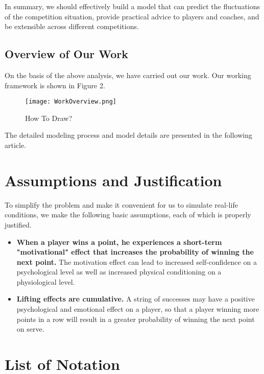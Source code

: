 \documentclass{mcmthesis}
\begin{document}
In summary, we should effectively build a model that can predict the fluctuations of the
competition situation, provide practical advice to players and coaches, and be extensible across
different competitions.
\subsection{Overview of Our Work}

On the basis of the above analysis, we have carried out our work. Our working framework
is shown in Figure 2.

\begin{figure}[h] 
  \centering
  \texttt{[image: WorkOverview.png]}
  \caption{How To Draw?} \label{fig2}
  \end{figure}
  The detailed modeling process and model details are presented in the following article.

\section{Assumptions and Justification}
To simplify the problem and make it convenient for us to simulate real-life conditions, we
make the following basic assumptions, each of which is properly justified.
\begin{itemize}
  \item \textbf{When a player wins a point, he experiences a short-term "motivational" effect
  that increases the probability of winning the next point.} The motivation effect can
lead to increased self-confidence on a psychological level as well as increased physical
conditioning on a physiological level.
  \item \textbf{Lifting effects are cumulative.} A string of successes may have a positive psychological
  and emotional effect on a player, so that a player winning more points in a row will result
  in a greater probability of winning the next point on serve.
\end{itemize}
\section{List of Notation}
\end{document}
